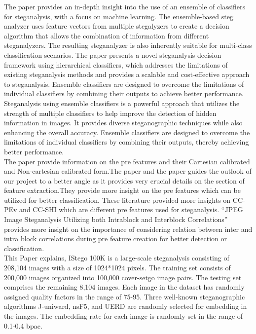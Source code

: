 The paper\cite{6} provides an in-depth insight into the use of an ensemble of classifiers for steganalysis, with a focus on machine learning. The ensemble-based steg analyzer uses feature vectors from multiple stegalyzers to create a decision algorithm that allows the combination of information from different steganalyzers. The resulting steganalyzer is also inherently suitable for multi-class classification scenarios. The paper presents a novel steganalysis decision framework using hierarchical classifiers, which addresses the limitations of existing steganalysis methods and provides a scalable and cost-effective approach to steganalysis. Ensemble classifiers are designed to overcome the limitations of individual classifiers by combining their outputs to achieve better performance. Steganalysis using ensemble classifiers is a powerful approach that utilizes the strength of multiple classifiers to help improve the detection of hidden information in images. It provides diverse steganographic techniques while also enhancing the overall accuracy. Ensemble classifiers are designed to overcome the limitations of individual classifiers by combining their outputs, thereby achieving better performance.\\
The paper\cite{9} provide information on the pre features and their Cartesian calibrated and Non-cartesian calibrated form.The paper\cite{10} and the paper\cite{11}  guides the outlook of our project to a better angle as it provides very crucial details on the section of feature extraction.They provide more insight on the pre features which can be utilized for better classification. These literature provided more insights on CC-PEv and CC-SHI which are different pre features used for steganalysis. “JPEG Image Steganalysis Utilizing both Intrablock and Interblock Correlations”  provides more insight on the importance of considering relation between inter and intra block correlations during pre feature creation for better detection or classification. \\
This Paper\cite{7} explains, IStego 100K is a large-scale steganalysis consisting of 208,104 images with a size of 1024*1024 pixels. The training set consists of 200,000 images organized into 100,000 cover-setgo image pairs. The testing set comprises the remaining 8,104 images. Each image in the dataset has randomly assigned quality factors in the range of 75-95. Three well-known steganographic algorithms J-uniward, nsF5, and UERD\cite{22}\cite{12}\cite{13} are randomly selected for embedding in the images. The embedding rate for each image is randomly set in the range of 0.1-0.4 bpac.\\ 
